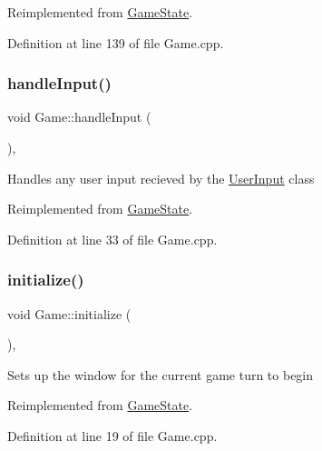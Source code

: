 Reimplemented from \mbox{\hyperlink{class_game_state_adf753ecc90e0b309c849b117036e619e}{Game\+State}}.



Definition at line 139 of file Game.\+cpp.

\mbox{\label{class_game_a59b929e54a2879beab72fc6ce724c313}} 
\subsubsection{\texorpdfstring{handleInput()}{handleInput()}}
{\footnotesize\ttfamily void Game\+::handle\+Input (\begin{DoxyParamCaption}{ }\end{DoxyParamCaption})\hspace{0.3cm}{\ttfamily [override]}, {\ttfamily [virtual]}}

Handles any user input recieved by the \mbox{\hyperlink{class_user_input}{User\+Input}} class 

Reimplemented from \mbox{\hyperlink{class_game_state_a734dd3521eb3056ee7d3f3e7c982b5a9}{Game\+State}}.



Definition at line 33 of file Game.\+cpp.

\mbox{\label{class_game_ae2cce13c2c6358709513a06932df939a}} 
\subsubsection{\texorpdfstring{initialize()}{initialize()}}
{\footnotesize\ttfamily void Game\+::initialize (\begin{DoxyParamCaption}{ }\end{DoxyParamCaption})\hspace{0.3cm}{\ttfamily [override]}, {\ttfamily [virtual]}}

Sets up the window for the current game turn to begin 

Reimplemented from \mbox{\hyperlink{class_game_state_a22d3404f53895a23359557a713194736}{Game\+State}}.



Definition at line 19 of file Game.\+cpp.

\mbox{\label{class_game_a5470c86c0d379e7cb50175b5079fd559}} 
